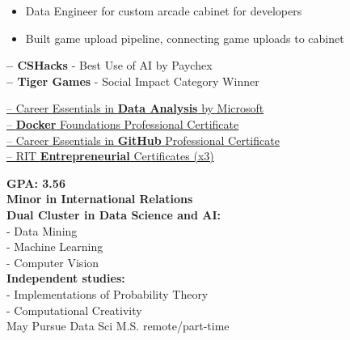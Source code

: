 \documentclass[10pt,a4paper,ragged2e,withhyper]{altacv}
\begin{document}
\begin{paracol}{2}
\divider

\begin{itemize}
    \item Data Engineer for custom arcade cabinet for developers
    \item Built game upload pipeline, connecting game uploads to cabinet
\end{itemize}\par



\textbf{ -- CSHacks} - Best Use of AI by Paychex\\
\textbf{ -- Tiger Games} - Social Impact Category Winner\\

\divider

\href{https://www.linkedin.com/learning/certificates/2cb69378c606fec5a6f3a107b99a896862db392b7a3692f71a6b53af5d5545c5}{ -- Career Essentials in \textbf{Data Analysis} by Microsoft}\\
\href{https://www.linkedin.com/learning/certificates/7b952323152e258ca468c33ddc9ebcf3c55036f58a5cfb3fb9c1410da655aaa5}{ -- \textbf{Docker} Foundations Professional Certificate}\\
\href{https://www.linkedin.com/learning/certificates/7facc28a13405134b3b7fa785303e9b1cf697f32d67f759e89960fbdc8a044d9}{ -- Career Essentials in \textbf{GitHub} Professional Certificate}\\
\href{https://rit.edu/simonecenter}{ -- RIT \textbf{Entrepreneurial} Certificates (x3)}\\

\switchcolumn


\textbf{GPA: 3.56}\\
\textbf{Minor in International Relations}\\
\textbf{Dual Cluster in Data Science and AI:}\\
 - Data Mining\\
 - Machine Learning\\
 - Computer Vision\\
\textbf{Independent studies:\\}
 - Implementations of Probability Theory\\
 - Computational Creativity\\
\medskip
May Pursue Data Sci M.S. remote/part-time


\end{paracol}
\end{document}
